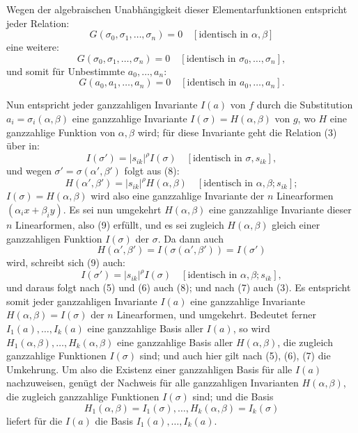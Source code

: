 \documentclass[11pt]{article}
\begin{document}
Wegen der algebraischen Unabhängigkeit dieser Elementarfunktionen entspricht jeder Relation:
\begin{equation}
        G(\sigma_0,\sigma_1,\ldots,\sigma_n)=0
        \quad [\text{identisch in \(\alpha,\beta\)}]
\end{equation}
eine weitere:
\begin{equation}
        G(\sigma_0,\sigma_1,\ldots,\sigma_n)=0
        \quad [\text{identisch in \(\sigma_0,\ldots,\sigma_n\)}],
\end{equation}
und somit für Unbestimmte \(a_0,\ldots,a_n\):
\begin{equation}
        G(a_0,a_1,\ldots,a_n)=0
        \quad [\text{identisch in \(a_0,\ldots,a_n\)}].
\end{equation}

Nun entspricht jeder ganzzahligen Invariante \(I(a)\) von \(f\) durch die Substitution \(a_i=\sigma_i(\alpha,\beta)\) eine ganzzahlige Invariante \(I(\sigma)=H(\alpha,\beta)\) von \(g\), wo \(H\) eine ganzzahlige Funktion von \(\alpha,\beta\) wird; für diese Invariante geht die Relation (3) über in:
\begin{equation}
        I(\sigma')=|s_{ik}|^\rho I(\sigma)
        \quad [\text{identisch in \(\sigma,s_{ik}\)}],
\end{equation}
und wegen \(\sigma'=\sigma(\alpha',\beta')\) folgt aus (8):
\begin{equation}
        H(\alpha',\beta')=|s_{ik}|^\rho H(\alpha,\beta)
        \quad [\text{identisch in \(\alpha,\beta;s_{ik}\)}];
\end{equation}
\(I(\sigma)=H(\alpha,\beta)\) wird also eine ganzzahlige Invariante der \(n\) Linearformen \((\alpha_i x+\beta_i y)\). Es sei nun umgekehrt \(H(\alpha,\beta)\) eine ganzzahlige Invariante dieser \(n\) Linearformen, also (9) erfüllt, und es sei zugleich \(H(\alpha,\beta)\) gleich einer ganzzahligen Funktion \(I(\sigma)\) der \(\sigma\). Da dann auch
\[
        H(\alpha',\beta')=I(\sigma(\alpha',\beta'))=I(\sigma')
\]
wird, schreibt sich (9) auch:
\begin{equation*}
        I(\sigma')=|s_{ik}|^\rho I(\sigma)
        \quad [\text{identisch in \(\alpha,\beta;s_{ik}\)}],\tag{9a}
\end{equation*}
und daraus folgt nach (5) und (6) auch (8); und nach (7) auch (3). Es entspricht somit jeder ganzzahligen Invariante \(I(a)\) eine ganzzahlige Invariante \(H(\alpha,\beta)=I(\sigma)\) der \(n\) Linearformen, und umgekehrt. Bedeutet ferner \(I_1(a),\ldots,I_k(a)\) eine ganzzahlige Basis aller \(I(a)\), so wird \(H_1(\alpha,\beta),\ldots,H_k(\alpha,\beta)\) eine ganzzahlige Basis aller \(H(\alpha,\beta)\), die zugleich ganzzahlige Funktionen \(I(\sigma)\) sind; und auch hier gilt nach (5), (6), (7) die Umkehrung. Um also die Existenz einer ganzzahligen Basis für alle \(I(a)\) nachzuweisen, genügt der Nachweis für alle ganzzahligen Invarianten \(H(\alpha,\beta)\), die zugleich ganzzahlige Funktionen \(I(\sigma)\) sind; und die Basis
\[
        H_1(\alpha,\beta)=I_1(\sigma),\ldots,H_k(\alpha,\beta)=I_k(\sigma)
\]
liefert für die \(I(a)\) die Basis \(I_1(a),\ldots,I_k(a)\).
\end{document}
